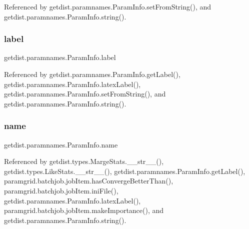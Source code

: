 Referenced by getdist.\+paramnames.\+Param\+Info.\+set\+From\+String(), and getdist.\+paramnames.\+Param\+Info.\+string().

\mbox{\label{classgetdist_1_1paramnames_1_1ParamInfo_a9db4ac644cf038d4c325de7a26fd4f20}} 
\subsubsection{\texorpdfstring{label}{label}}
{\footnotesize\ttfamily getdist.\+paramnames.\+Param\+Info.\+label}



Referenced by getdist.\+paramnames.\+Param\+Info.\+get\+Label(), getdist.\+paramnames.\+Param\+Info.\+latex\+Label(), getdist.\+paramnames.\+Param\+Info.\+set\+From\+String(), and getdist.\+paramnames.\+Param\+Info.\+string().

\mbox{\label{classgetdist_1_1paramnames_1_1ParamInfo_afbbc9d0845233cbdb99137ff23b92cbd}} 
\subsubsection{\texorpdfstring{name}{name}}
{\footnotesize\ttfamily getdist.\+paramnames.\+Param\+Info.\+name}



Referenced by getdist.\+types.\+Marge\+Stats.\+\_\+\+\_\+str\+\_\+\+\_\+(), getdist.\+types.\+Like\+Stats.\+\_\+\+\_\+str\+\_\+\+\_\+(), getdist.\+paramnames.\+Param\+Info.\+get\+Label(), paramgrid.\+batchjob.\+job\+Item.\+has\+Converge\+Better\+Than(), paramgrid.\+batchjob.\+job\+Item.\+ini\+File(), getdist.\+paramnames.\+Param\+Info.\+latex\+Label(), paramgrid.\+batchjob.\+job\+Item.\+make\+Importance(), and getdist.\+paramnames.\+Param\+Info.\+string().

\mbox{\label{classgetdist_1_1paramnames_1_1ParamInfo_ab94916bce53105db07e78ab672a7a314}} 
